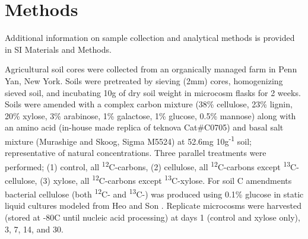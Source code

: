 \section{Methods}
Additional information on sample collection and analytical methods is provided in SI Materials and Methods.


Agricultural soil cores were collected from an organically managed farm in Penn Yan, New York. Soils were pretreated by sieving (2mm) cores, homogenizing sieved soil, and incubating 10g of dry soil weight in microcosm flasks for 2 weeks.  Soils were amended with a complex carbon mixture (38\% cellulose, 23\% lignin, 20\% xylose, 3\% arabinose, 1\% galactose, 1\% glucose, 0.5\% mannose) along with an amino acid (in-house made replica of teknova Cat#C0705) and basal salt mixture (Murashige and Skoog, Sigma M5524) at 52.6mg 10g\textsuperscript{-1} soil; representative of natural concentrations. Three parallel treatments were performed; (1) control, all \textsuperscript{12}C-carbons, (2) cellulose, all \textsuperscript{12}C-carbons except \textsuperscript{13}C-cellulose, (3) xylose, all \textsuperscript{12}C-carbons except \textsuperscript{13}C-xylose. For soil C amendments bacterial cellulose (both \textsuperscript{12}C- and \textsuperscript{13}C-) was produced using 0.1\% glucose in static liquid cultures modeled from Heo and Son \cite{Heo_Son_2002}. Replicate microcosms were harvested (stored at -80{\textdegree}C until nucleic acid processing) at days 1 (control and xylose only), 3, 7, 14, and 30.




